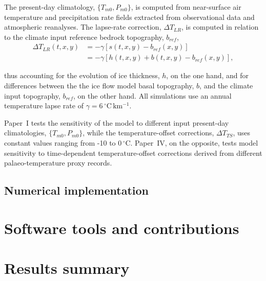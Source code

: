 \documentclass{article}
\newcommand{\unit}[1]{\ensuremath{\mathrm{#1}}}
\newcommand{\degree}[0]{\ensuremath{^{\circ}}}
\newcommand{\degC}[0]{\unit{{\degree}C}}
\begin{document}
The present-day climatology, $\{T_{m0}, P_{m0}\}$, is computed from
near-surface air temperature and precipitation rate fields extracted from
observational data and atmospheric reanalyses.
The lapse-rate correction, ${\Delta}T_{LR}$, is computed in relation to the
climate input reference bedrock topography, $b_{ref}$,
\begin{align}
    {\Delta}T_{LR}(t, x, y) &= -\gamma [s(t, x, y)-b_{ref}(x, y)] \\
                            &= -\gamma [h(t, x, y)+b(t, x, y)-b_{ref}(x, y)],
\end{align}

thus accounting for the evolution of ice thickness, $h$, on the one hand, and
for differences between the the ice flow model basal topography, $b$, and the
climate input topography, $b_{ref}$, on the other hand. All simulations use an
annual temperature lapse rate of $\gamma = 6\,\unit{\degC\,km^{-1}}$.

Paper~I tests the sensitivity of the model to different input present-day
climatologies, $\{T_{m0}, P_{m0}\}$, while the temperature-offset corrections,
${\Delta}T_{TS}$, uses constant values ranging from -10 to 0\,\degC. Paper~IV,
on the opposite, tests model sensitivity to time-dependent temperature-offset
corrections derived from different palaeo-temperature proxy records.

\subsection{Numerical implementation}




\section{Software tools and contributions}


\section{Results summary}
\end{document}
